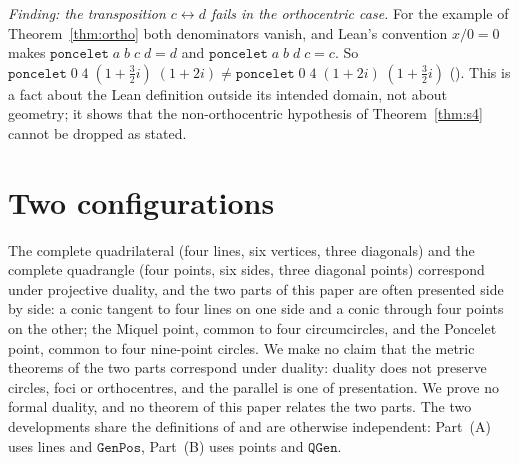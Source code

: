 \documentclass[11pt]{article}
\theoremstyle{definition}
\theoremstyle{remark}
\newcommand{\lean}[1]{\texttt{#1}}
\begin{document}
\emph{Finding: the transposition $c\leftrightarrow d$ fails in the orthocentric case.} For the example
of Theorem~\ref{thm:ortho} both denominators vanish, and Lean's convention $x/0=0$ makes
$\lean{poncelet}\;a\;b\;c\;d=d$ and $\lean{poncelet}\;a\;b\;d\;c=c$. So
$\lean{poncelet}\;0\;4\;(1+\tfrac32i)\;(1+2i)\neq\lean{poncelet}\;0\;4\;(1+2i)\;(1+\tfrac32i)$
(). This is a fact about the Lean definition outside its
intended domain, not about geometry; it shows that the non-orthocentric hypothesis of
Theorem~\ref{thm:s4} cannot be dropped as stated.

\section{Two configurations}\label{sec:duality}
The complete quadrilateral (four lines, six vertices, three diagonals) and the complete quadrangle (four
points, six sides, three diagonal points) correspond under projective duality, and the two parts of this
paper are often presented side by side: a conic tangent to four lines on one side and a conic through
four points on the other; the Miquel point, common to four circumcircles, and the Poncelet point,
common to four nine-point circles. We make no claim that the metric theorems of the two parts correspond under duality: duality does
not preserve circles, foci or orthocentres, and the parallel is one of presentation. We prove no
formal duality, and no theorem of this paper relates the two parts. The two developments share the
definitions of \cite{paperE} and are otherwise independent: Part~(A) uses lines and $\lean{GenPos}$,
Part~(B) uses points and $\lean{QGen}$.
\end{document}
